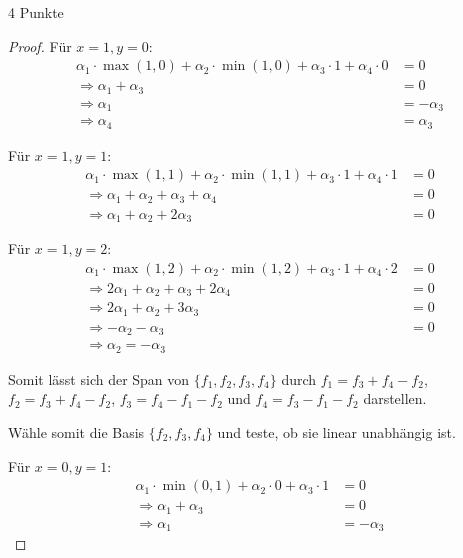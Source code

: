 \documentclass{../problemset}
\begin{document}
\begin{problem}{4 Punkte}
\begin{proof}
	Für $x = 1, y = 0$:
	\begin{align*}
		\alpha_1 \cdot \max(1, 0) + \alpha_2 \cdot \min(1, 0) + \alpha_3 \cdot 1 + \alpha_4 \cdot 0 & = 0         \\
		\Rightarrow \alpha_1 + \alpha_3                                                             & = 0         \\
		\Rightarrow \alpha_1                                                                        & = -\alpha_3 \\
		\Rightarrow \alpha_4                                                                        & = \alpha_3
	\end{align*}

	Für $x = 1, y = 1$:
	\begin{align*}
		\alpha_1 \cdot \max(1, 1) + \alpha_2 \cdot \min(1, 1) + \alpha_3 \cdot 1 + \alpha_4 \cdot 1 & = 0 \\
		\Rightarrow \alpha_1 + \alpha_2 + \alpha_3 + \alpha_4                                       & = 0 \\
		\Rightarrow \alpha_1 + \alpha_2 + 2 \alpha_3                                                & = 0
	\end{align*}

	Für $x = 1, y = 2$:
	\begin{align*}
		\alpha_1 \cdot \max(1, 2) + \alpha_2 \cdot \min(1, 2) + \alpha_3 \cdot 1 + \alpha_4 \cdot 2 & = 0 \\
		\Rightarrow 2\alpha_1 + \alpha_2 + \alpha_3 + 2\alpha_4                                     & = 0 \\
		\Rightarrow 2\alpha_1 + \alpha_2 + 3 \alpha_3                                               & = 0 \\
		\Rightarrow -\alpha_2 - \alpha_3                                                            & = 0 \\
		\Rightarrow \alpha_2 = - \alpha_3
	\end{align*}

	Somit lässt sich der Span von $\{f_1, f_2, f_3, f_4\}$ durch $f_1 = f_3 + f_4 - f_2$, $f_2 = f_3 + f_4 - f_2$, $f_3 = f_4 - f_1 - f_2$ und $f_4 = f_3 - f_1 - f_2$ darstellen.

	Wähle somit die Basis $\{f_2, f_3, f_4\}$ und teste, ob sie linear unabhängig ist.

	Für $x = 0, y = 1$:
	\begin{align*}
		\alpha_1 \cdot \min(0, 1) + \alpha_2 \cdot 0 + \alpha_3 \cdot 1 & = 0         \\
		\Rightarrow \alpha_1 + \alpha_3                                 & = 0         \\
		\Rightarrow \alpha_1                                            & = -\alpha_3
	\end{align*}


\end{proof}
\end{problem}
\end{document}
